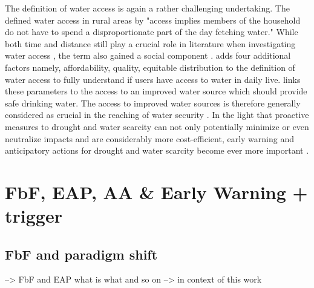 {The definition of water access is again a rather challenging undertaking. The \autocite[254]{worldbankWorldDevelopmentReport1997} defined water access in rural areas by "access implies members of the household do not have to spend a disproportionate part of the day fetching water." While both time and distance still play a crucial role in literature when investigating water access \autocite{cassiviDrinkingWaterAccessibility2019,cassiviEvaluatingSelfreportedMeasures2021,emenikeAccessingSafeDrinking2017}, the term also gained a social component \autocite{emenikeAccessingSafeDrinking2017,mitlinUnaffordableUndrinkable}. \autocite{obeng-odoomAccessWater2012} adds four additional factors namely, affordability, quality, equitable distribution to the definition of water access to fully understand if users have access to water in daily live. \autocite{unitednations/developmentprogrammeDeepeningDemocracyFragmented2002} links these parameters to the access to an improved water source which should provide safe drinking water.
The access to improved water sources is therefore generally considered as crucial in the reaching of water security \autocite{cdcAssessingAccessWater2022}. In the light that proactive measures to drought and water scarcity can not only potentially minimize or even neutralize impacts and are considerably more cost-efficient, early warning and anticipatory actions for drought and water scarcity become ever more important \autocite{faoandun-waterProgressLevelWater2021,idmpDroughtWaterScarcity2022,worldbankHighDryClimate2016}.



\section{FbF, EAP, AA & Early Warning + trigger}

\subsection{FbF and paradigm shift}
--> FbF and EAP what is what and so on --> in context of this work


}
